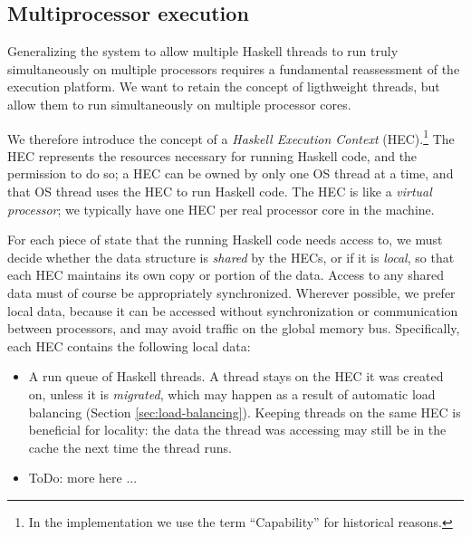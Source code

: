 \subsection{Multiprocessor execution}


Generalizing the system to allow multiple Haskell threads to run truly
simultaneously on multiple processors requires a fundamental
reassessment of the execution platform.  We want to retain the concept
of ligthweight threads, but allow them to run simultaneously on
multiple processor cores.

We therefore introduce the concept of a \emph{Haskell Execution
  Context} (HEC).\footnote{In the implementation we use the term
  ``Capability'' for historical reasons.}  The HEC represents the
resources necessary for running Haskell code, and the permission to do
so; a HEC can be owned by only one OS thread at a time, and that OS
thread uses the HEC to run Haskell code.  The HEC is like a
\emph{virtual processor}; we typically have one HEC per real processor
core in the machine.

For each piece of state that the running Haskell code needs access to,
we must decide whether the data structure is \emph{shared} by the
HECs, or if it is \emph{local}, so that each HEC maintains its
own copy or portion of the data.  Access to any shared data must of
course be appropriately synchronized.  Wherever possible, we prefer
local data, because it can be accessed without synchronization or
communication between processors, and may avoid traffic on the global
memory bus.  Specifically, each HEC contains the
following local data:

\begin{itemize}
\item A run queue of Haskell threads.  A thread stays on the HEC it
  was created on, unless it is \emph{migrated}, which may happen as a
  result of automatic load balancing (Section
  \ref{sec:load-balancing}).  Keeping threads on the same HEC is
  beneficial for locality: the data the thread was accessing may still
  be in the cache the next time the thread runs.

\item ToDo: more here ...
\end{itemize}

